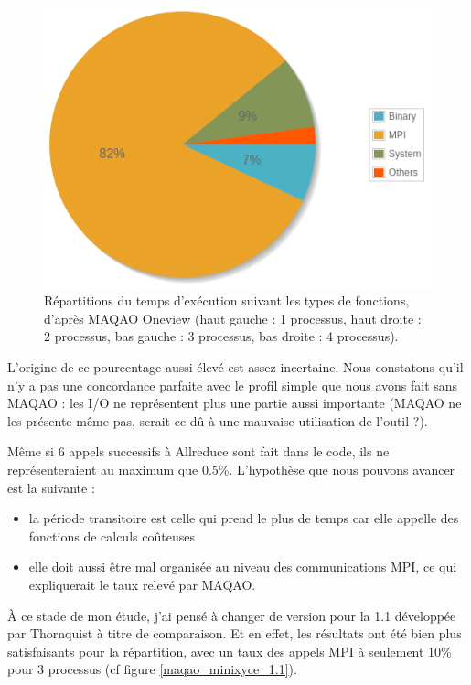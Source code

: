 \documentclass[11pt,a4paper,oneside]{memoir}
\theoremstyle{definition}
\theoremstyle{remark}
\theoremstyle{plain}
\begin{document}
\begin{figure}
\begin{center}
\includegraphics[scale=0.45]{Images-Rapport/MAQAO_V1/miniXyce_RLC100_4proc.png}
\caption{Répartitions du temps d'exécution suivant les types de fonctions, d'après MAQAO Oneview (haut gauche : 1 processus, haut droite : 2 processus, bas gauche : 3 processus, bas droite : 4 processus).}
\label{maqao_minixyce_v1}
\end{center}
\end{figure}


L'origine de ce pourcentage aussi élevé est assez incertaine. Nous constatons qu'il n'y a pas une concordance parfaite avec le profil simple que nous avons fait sans MAQAO : les I/O ne représentent plus une partie aussi importante (MAQAO ne les présente même pas, serait-ce dû à une mauvaise utilisation de l'outil ?).

Même si 6 appels successifs à Allreduce sont fait dans le code, ils ne représenteraient au maximum que 0.5\%. L'hypothèse que nous pouvons avancer est la suivante :
\begin{itemize}
\item la période transitoire est celle qui prend le plus de temps car elle appelle des fonctions de calculs coûteuses
\item elle doit aussi être mal organisée au niveau des communications MPI, ce qui expliquerait le taux relevé par MAQAO.
\end{itemize}\bigskip

\`A ce stade de mon étude, j'ai pensé à changer de version pour la 1.1 développée par Thornquist \cite{minixyce-code} à titre de comparaison. Et en effet, les résultats ont été bien plus satisfaisants pour la répartition, avec un taux des appels MPI à seulement 10\% pour 3 processus (cf figure \ref{maqao_minixyce_1.1}).
\end{document}
